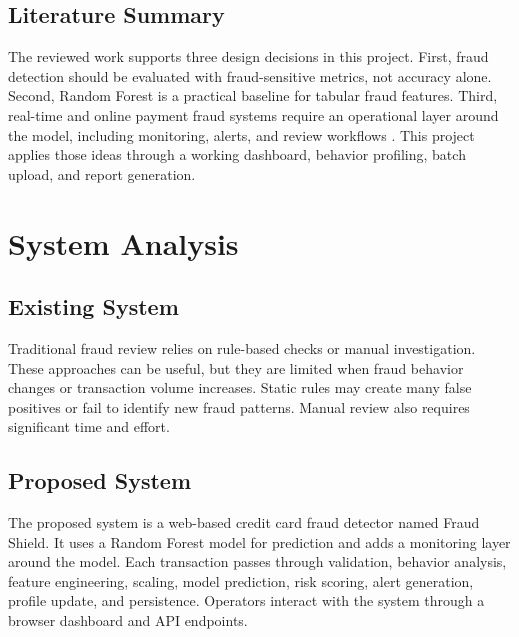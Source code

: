 \documentclass[12pt,a4paper]{report}
\begin{document}
\section{Literature Summary}
The reviewed work supports three design decisions in this project. First, fraud detection should be evaluated with fraud-sensitive metrics, not accuracy alone. Second, Random Forest is a practical baseline for tabular fraud features. Third, real-time and online payment fraud systems require an operational layer around the model, including monitoring, alerts, and review workflows \cite{tadvi2021realtime,almazroi2023onlinepayment}. This project applies those ideas through a working dashboard, behavior profiling, batch upload, and report generation.

\chapter{System Analysis}

\section{Existing System}
Traditional fraud review relies on rule-based checks or manual investigation. These approaches can be useful, but they are limited when fraud behavior changes or transaction volume increases. Static rules may create many false positives or fail to identify new fraud patterns. Manual review also requires significant time and effort.

\section{Proposed System}
The proposed system is a web-based credit card fraud detector named Fraud Shield. It uses a Random Forest model for prediction and adds a monitoring layer around the model. Each transaction passes through validation, behavior analysis, feature engineering, scaling, model prediction, risk scoring, alert generation, profile update, and persistence. Operators interact with the system through a browser dashboard and API endpoints.
\end{document}
